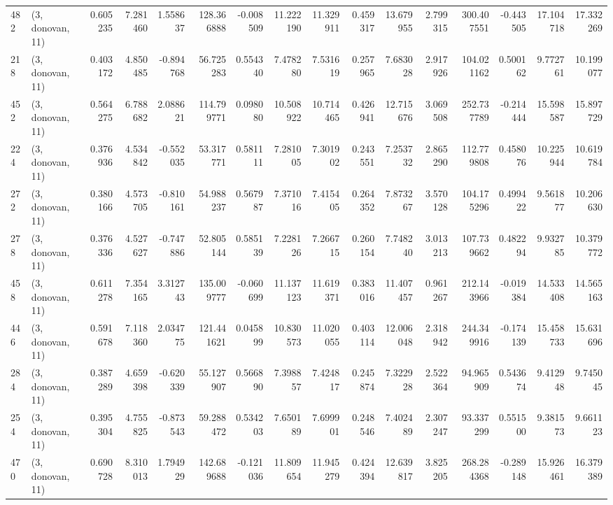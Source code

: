 \begin{tabular}{llrrrrrrrrrrrrrr}
482 &  (3, donovan, 11) &   0.605235 &   7.281460 &   1.558637 &   128.366888 &  -0.008509 &  11.222190 &  11.329911 &  0.459317 &  13.679955 &   2.799315 &   300.407551 &  -0.443505 &  17.104718 &  17.332269 \\
218 &  (3, donovan, 11) &   0.403172 &   4.850485 &  -0.894768 &    56.725283 &   0.554340 &   7.478280 &   7.531619 &  0.257965 &   7.683028 &   2.917926 &   104.021162 &   0.500162 &   9.772761 &  10.199077 \\
452 &  (3, donovan, 11) &   0.564275 &   6.788682 &   2.088621 &   114.799771 &   0.098080 &  10.508922 &  10.714465 &  0.426941 &  12.715676 &   3.069508 &   252.737789 &  -0.214444 &  15.598587 &  15.897729 \\
224 &  (3, donovan, 11) &   0.376936 &   4.534842 &  -0.552035 &    53.317771 &   0.581111 &   7.281005 &   7.301902 &  0.243551 &   7.253732 &   2.865290 &   112.779808 &   0.458076 &  10.225944 &  10.619784 \\
272 &  (3, donovan, 11) &   0.380166 &   4.573705 &  -0.810161 &    54.988237 &   0.567987 &   7.371016 &   7.415405 &  0.264352 &   7.873267 &   3.570128 &   104.175296 &   0.499422 &   9.561877 &  10.206630 \\
278 &  (3, donovan, 11) &   0.376336 &   4.527627 &  -0.747886 &    52.805144 &   0.585139 &   7.228126 &   7.266715 &  0.260154 &   7.748240 &   3.013213 &   107.739662 &   0.482294 &   9.932785 &  10.379772 \\
458 &  (3, donovan, 11) &   0.611278 &   7.354165 &   3.312743 &   135.009777 &  -0.060699 &  11.137123 &  11.619371 &  0.383016 &  11.407457 &   0.961267 &   212.143966 &  -0.019384 &  14.533408 &  14.565163 \\
446 &  (3, donovan, 11) &   0.591678 &   7.118360 &   2.034775 &   121.441621 &   0.045899 &  10.830573 &  11.020055 &  0.403114 &  12.006048 &   2.318942 &   244.349916 &  -0.174139 &  15.458733 &  15.631696 \\
284 &  (3, donovan, 11) &   0.387289 &   4.659398 &  -0.620339 &    55.127907 &   0.566890 &   7.398857 &   7.424817 &  0.245874 &   7.322928 &   2.522364 &    94.965909 &   0.543674 &   9.412948 &   9.745045 \\
254 &  (3, donovan, 11) &   0.395304 &   4.755825 &  -0.873543 &    59.288472 &   0.534203 &   7.650189 &   7.699901 &  0.248546 &   7.402489 &   2.307247 &    93.337299 &   0.551500 &   9.381573 &   9.661123 \\
470 &  (3, donovan, 11) &   0.690728 &   8.310013 &   1.794929 &   142.689688 &  -0.121036 &  11.809654 &  11.945279 &  0.424394 &  12.639817 &   3.825205 &   268.284368 &  -0.289148 &  15.926461 &  16.379389 \\

\end{tabular}
